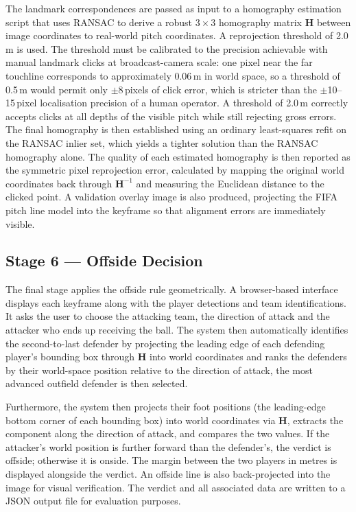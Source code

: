 The landmark correspondences are passed as input to a homography estimation script that uses RANSAC to derive a robust $3 \times 3$ homography matrix $\mathbf{H}$ between image coordinates to real-world pitch coordinates. A reprojection threshold of 2.0\,m is used. The threshold must be calibrated to the precision achievable with manual landmark clicks at broadcast-camera scale: one pixel near the far touchline corresponds to approximately 0.06\,m in world space, so a threshold of 0.5\,m would permit only $\pm$8\,pixels of click error, which is stricter than the $\pm$10--15\,pixel localisation precision of a human operator. A threshold of 2.0\,m correctly accepts clicks at all depths of the visible pitch while still rejecting gross errors. The final homography is then established using an ordinary least-squares refit on the RANSAC inlier set, which yields a tighter solution than the RANSAC homography alone. The quality of each estimated homography is then reported as the symmetric pixel reprojection error, calculated by mapping the original world coordinates back through $\mathbf{H}^{-1}$ and measuring the Euclidean distance to the clicked point. A validation overlay image is also produced, projecting the FIFA pitch line model into the keyframe so that alignment errors are immediately visible.

\subsection{Stage 6 — Offside Decision}%
\label{sec:design_offside}

The final stage applies the offside rule geometrically. A browser-based interface displays each keyframe along with the player detections and team identifications. It asks the user to choose the attacking team, the direction of attack and the attacker who ends up receiving the ball. The system then automatically identifies the second-to-last defender by projecting the leading edge of each defending player's bounding box through $\mathbf{H}$ into world coordinates and ranks the defenders by their world-space position relative to the direction of attack, the most advanced outfield defender is then selected.

Furthermore, the system then projects their foot positions (the leading-edge bottom corner of each bounding box) into world coordinates via $\mathbf{H}$, extracts the component along the direction of attack, and compares the two values. If the attacker's world position is further forward than the defender's, the verdict is offside; otherwise it is onside. The margin between the two players in metres is displayed alongside the verdict. An offside line is also back-projected into the image for visual verification. The verdict and all associated data are written to a JSON output file for evaluation purposes.

